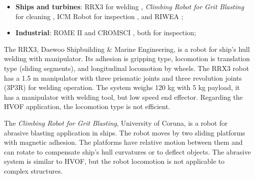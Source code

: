 \begin{itemize}
  \item \textbf{Ships and turbines}: RRX3 for welding
   \citep{rrx3}, \textit{Climbing Robot for Grit Blasting} for cleaning
   \citep{crgb}, ICM Robot for inspection \citep{icm}, and RIWEA \citep{riwea};
  \item \textbf{Industrial}: ROME II \citep{roma} and CROMSCI \citep{CROMSCI}, both for inspection;
\end{itemize}

The RRX3, Daewoo Shipbuilding \& Marine Engineering, is a
robot for ship's hull welding with manipulator. Its adhesion is gripping
type, locomotion is translation type (sliding segments), and longitudinal locomotion by wheels.
The RRX3 robot has a 1.5 m manipulator with three prismatic joints and three
revolution joints  (3P3R) for welding operation. The system weighs 120 kg with 5
kg payload, it has a manipulator with welding tool, but low speed end effector.
Regarding the HVOF application, the locomotion type is not efficient.



The \emph{Climbing Robot for Grit Blasting}, %
University of Coruna, is a robot for abrasive blasting application in ships. The
robot moves by two sliding platforms with magnetic adhesion. The platforms have relative motion
between them and can rotate to compensate ship's hull curvatures or to
deflect objects. The abrasive system is similar to HVOF, but the robot
locomotion is not applicable to complex structures.

